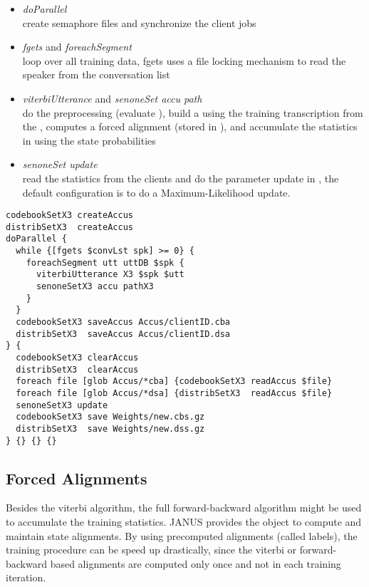 \begin{itemize}
\item {\em doParallel}\\
  create semaphore files and synchronize the client jobs
\item {\em fgets} and {\em foreachSegment}\\
  loop over all training data, fgets uses a file locking mechanism
  to read the speaker from the conversation list
\item {\em viterbiUtterance} and {\em senoneSet accu path} \\
  do the preprocessing (evaluate ), build a  
  using the training transcription from the , computes a forced 
  alignment (stored in ), and accumulate the statistics 
  in  using the state probabilities
\item {\em senoneSet update}\\
  read the statistics from the clients and do the parameter update in , 
  the default configuration is to do a Maximum-Likelihood update.
\end{itemize}

\begin{verbatim}
codebookSetX3 createAccus
distribSetX3  createAccus
doParallel {
  while {[fgets $convLst spk] >= 0} {
    foreachSegment utt uttDB $spk { 
      viterbiUtterance X3 $spk $utt 
      senoneSetX3 accu pathX3
    }
  }
  codebookSetX3 saveAccus Accus/clientID.cba
  distribSetX3  saveAccus Accus/clientID.dsa
} {
  codebookSetX3 clearAccus
  distribSetX3  clearAccus
  foreach file [glob Accus/*cba] {codebookSetX3 readAccus $file}
  foreach file [glob Accus/*dsa] {distribSetX3  readAccus $file}
  senoneSetX3 update
  codebookSetX3 save Weights/new.cbs.gz
  distribSetX3  save Weights/new.dss.gz 
} {} {} {}

\end{verbatim}

\subsection{Forced Alignments}

Besides the viterbi  algorithm,  the  full forward-backward  algorithm
might  be used to accumulate the  training  statistics. JANUS provides
the     object   to compute   and   maintain  state
alignments.  By   using precomputed  alignments   (called labels), the
training procedure can be  speed up drastically, since the  viterbi or
forward-backward  based alignments are  computed  only once and not in
each training iteration.

